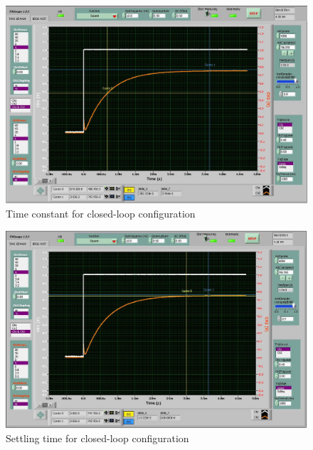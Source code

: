 \documentclass[12pt]{article}
\begin{document}
\begin{figure}[ht]
\centering
\includegraphics[width=7in]{TimeConstantClosed.jpg}
\caption{Time constant for closed-loop configuration}
\label{fig:time-closed}
\end{figure}

\begin{figure}[ht]
\centering
\includegraphics[width=7in]{SettlingClosed.jpg}
\caption{Settling time for closed-loop configuration}
\label{fig:settle-closed}
\end{figure}
\end{document}
